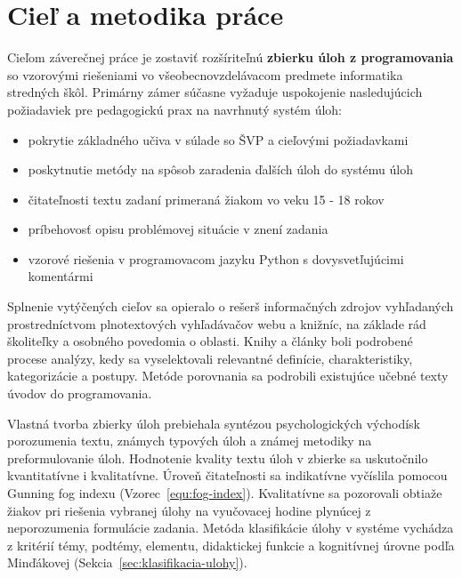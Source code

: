 \chapter{Cieľ a metodika práce}
Cieľom záverečnej práce je zostaviť rozšíriteľnú \textbf{zbierku úloh z programovania} so vzorovými riešeniami vo všeobecnovzdelávacom predmete informatika stredných škôl. Primárny zámer súčasne vyžaduje uspokojenie nasledujúcich požiadaviek pre pedagogickú prax na navrhnutý systém úloh:

\begin{itemize}[noitemsep]
\item pokrytie základného učiva v súlade so ŠVP a cieľovými požiadavkami 
\item poskytnutie metódy na spôsob zaradenia ďalších úloh do systému úloh
\item čitateľnosti textu zadaní primeraná žiakom vo veku 15 - 18 rokov
\item príbehovosť opisu problémovej situácie v znení zadania
\item vzorové riešenia v programovacom jazyku Python s dovysvetľujúcimi komentármi
\end{itemize}

Splnenie vytýčených cieľov sa opieralo o rešerš informačných zdrojov vyhľadaných prostredníctvom plnotextových vyhľadávačov webu a knižníc, na základe rád školiteľky a osobného povedomia o oblasti. Knihy a články boli podrobené procese analýzy, kedy sa vyselektovali relevantné definície, charakteristiky, kategorizácie a postupy. Metóde porovnania sa podrobili existujúce učebné texty úvodov do programovania. 

Vlastná tvorba zbierky úloh prebiehala syntézou psychologických východísk porozumenia textu, známych typových úloh a známej metodiky na preformulovanie úloh. Hodnotenie kvality textu úloh v zbierke sa uskutočnilo kvantitatívne i kvalitatívne. Úroveň čitateľnosti sa indikatívne vyčíslila pomocou Gunning fog indexu (Vzorec~\ref{equ:fog-index}). Kvalitatívne sa pozorovali obtiaže žiakov pri riešenia vybranej úlohy na vyučovacej hodine plynúcej z neporozumenia formulácie zadania. Metóda klasifikácie úlohy v systéme vychádza z kritérií témy, podtémy, elementu, didaktickej funkcie a kognitívnej úrovne podľa Minďákovej (Sekcia~\ref{sec:klasifikacia-ulohy}).
